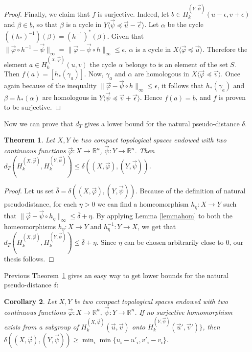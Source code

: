 \documentclass{amsart}
\newtheorem{theorem}{Theorem}[section]
\newtheorem{corollary}[theorem]{Corollary}
\theoremstyle{definition}
\theoremstyle{remark}
\newcommand{\p}{\varphi}
\newcommand{\R}{\mathbb{R}}
\numberwithin{equation}{section}
\begin{document}
\begin{proof}
Finally, we claim that $f$ is surjective. Indeed, let  $b\in  H^{(Y,\vec\psi)}_k(u-\epsilon,v+\epsilon)$ and $\beta\in b$, so that $\beta$ is a cycle in $Y\langle\vec\psi\preceq \vec u-\vec\epsilon\rangle$. Let $\alpha$ be the cycle $\left((h_*)^{-1}\right)(\beta)=\left(h^{-1}\right)^*(\beta)$. Given that $\|\vec\varphi\circ h^{-1}-\vec\psi\|_\infty=\|\vec\varphi-\vec\psi\circ h\|_\infty\le \epsilon$, $\alpha$ is a cycle in $X\langle\vec\varphi\preceq \vec u\rangle$. Therefore the element $a\in  H^{(X,\vec\varphi)}_k(u,v)$ the cycle $\alpha$ belongs to is an element of the set $S$. Then $f(a)=[h_*(\gamma_{a})]$. Now, $\gamma_{a}$ and $\alpha$ are homologous in $X\langle\vec\varphi\preceq \vec v\rangle$. Once again because of the inequality $\|\vec\varphi-\vec\psi\circ h\|_\infty\le \epsilon$, it follows that $h_*(\gamma_{a})$ and $\beta=h_*(\alpha)$ are homologous in $Y\langle\vec\psi\preceq \vec v+\vec\epsilon\rangle$. Hence $f(a)=b$, and $f$ is proven to be surjective.

\end{proof}

Now we can prove that $d_T$ gives a lower bound for the natural pseudo-distance $\delta$.

\begin{theorem}\label{bound}
Let $X,Y$ be two compact topological spaces  endowed with
two continuous functions $\vec \varphi: X \to \R^n$, $\vec \psi: Y
\to \R^n$. Then
$d_T\left( H^{(X,\vec\varphi)}_k, H^{(Y,\vec\psi)}_k\right)\le \delta\left((X,\vec\p),(Y,\vec\psi)\right)$.
\end{theorem}

\begin{proof}\label{proofbound}
Let us set $\bar \delta=\delta\left((X,\vec\varphi),(Y,\vec\psi)\right)$.
Because of the definition of natural pseudodistance, for each $\eta>0$ we can find a homeomorphism
$h_\eta:X\to Y$ such that $\|\vec \varphi-\vec \psi\circ h_\eta\|_\infty\le \bar\delta+\eta$.
By applying Lemma \ref{lemmahom} to both the homeomorphisms
$h_\eta:X\to Y$ and $h_\eta^{-1}:Y\to X$, we get that $d_T\left( H^{(X,\vec\varphi)}_k, H^{(Y,\vec\psi)}_k\right)\le \bar\delta+\eta$.
Since $\eta$ can be chosen arbitrarily close to $0$, our thesis follows.
\end{proof}

Previous Theorem~\ref{bound} gives an easy way to get lower bounds for the natural pseudo-distance $\delta$:

\begin{corollary}\label{cor1}
Let $X,Y$ be two compact topological spaces  endowed with
two continuous functions $\vec \varphi: X \to \R^n$, $\vec \psi: Y
\to \R^n$. If no surjective homomorphism exists from a subgroup of $ H^{(X,\vec\varphi)}_k(\vec u,\vec v)$ onto $ H^{(Y,\vec\psi)}_k(\vec u',\vec v')\}$, then  $\delta\left((X,\vec\varphi),(Y,\vec\psi)\right)\ge \min_i\min \{u_i-u'_i,v'_i-v_i\}$.
\end{corollary}
\end{document}
